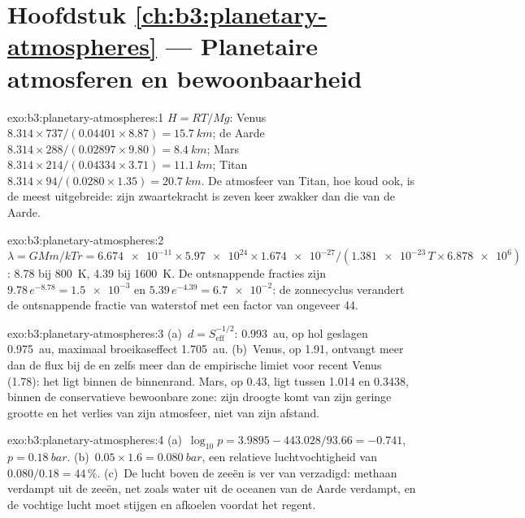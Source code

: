 \section*{Hoofdstuk \ref{ch:b3:planetary-atmospheres} --- Planetaire atmosferen en bewoonbaarheid}

\begin{solution}{exo:b3:planetary-atmospheres:1}
$H = RT/Mg$: Venus $8.314\times737/(0.04401\times8.87) = \qty{15.7}{km}$;
de Aarde $8.314\times288/(0.02897\times9.80) = \qty{8.4}{km}$; Mars
$8.314\times214/(0.04334\times3.71) = \qty{11.1}{km}$; Titan
$8.314\times94/(0.0280\times1.35) = \qty{20.7}{km}$. De atmosfeer van Titan,
hoe koud ook, is de meest uitgebreide: zijn zwaartekracht is
zeven keer zwakker dan die van de Aarde.
\end{solution}

\begin{solution}{exo:b3:planetary-atmospheres:2}
$\lambda = GMm/kTr = \num{6.674e-11}\times\num{5.97e24}\times\num{1.674e-27}
/(\num{1.381e-23}\,T\times\num{6.878e6})$: 8.78 bij \qty{800}{K}, 4.39 bij
\qty{1600}{K}. De ontsnappende fracties zijn $9.78\,e^{-8.78} =
\num{1.5e-3}$ en $5.39\,e^{-4.39} = \num{6.7e-2}$: de zonnecyclus
verandert de ontsnappende fractie van waterstof met een factor van ongeveer 44.
\end{solution}

\begin{solution}{exo:b3:planetary-atmospheres:3}
(a)~$d = S_\mathrm{eff}^{-1/2}$:  \qty{0.993}{au}, op hol geslagen
\qty{0.975}{au}, maximaal broeikaseffect \qty{1.705}{au}. (b)~Venus, op 1.91,
ontvangt meer dan de flux bij de  en zelfs meer dan de empirische
limiet voor recent Venus (1.78): het ligt binnen de binnenrand. Mars, op 0.43,
ligt tussen 1.014 en 0.3438, binnen de conservatieve bewoonbare zone:
zijn droogte komt van zijn geringe grootte en het verlies van zijn atmosfeer, niet
van zijn afstand.
\end{solution}

\begin{solution}{exo:b3:planetary-atmospheres:4}
(a)~$\log_{10}p = 3.9895 - 443.028/93.66 = -0.741$, $p =
\qty{0.18}{bar}$. (b)~$0.05\times1.6 = \qty{0.080}{bar}$, een relatieve
luchtvochtigheid van $0.080/0.18 = 44\,\%$. (c)~De lucht boven de zeeën is ver van
verzadigd: methaan verdampt uit de zeeën, net zoals water uit de
oceanen van de Aarde verdampt, en de vochtige lucht moet stijgen en afkoelen voordat het regent.
\end{solution}

